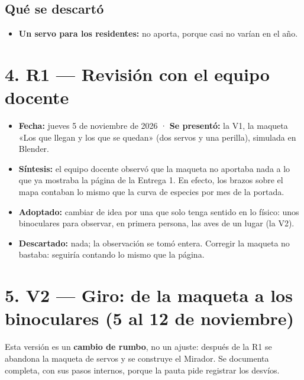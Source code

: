 \documentclass[11pt,a4paper]{article}
\newcommand{\seccion}[1]{\clearpage\section*{#1}}
\begin{document}
\subsection*{Qué se descartó}
\begin{itemize}
\item \textbf{Un servo para los residentes:} no aporta, porque casi no varían en el año.
\end{itemize}
\section*{4. R1 --- Revisión con el equipo docente}
\begin{itemize}
\item \textbf{Fecha:} jueves 5 de noviembre de 2026 · \textbf{Se presentó:} la V1, la maqueta «Los que llegan y los que se quedan» (dos servos y una perilla), simulada en Blender.
\item \textbf{Síntesis:} el equipo docente observó que la maqueta no aportaba nada a lo que ya mostraba la página de la Entrega 1. En efecto, los brazos sobre el mapa contaban lo mismo que la curva de especies por mes de la portada.
\item \textbf{Adoptado:} cambiar de idea por una que solo tenga sentido en lo físico: unos binoculares para observar, en primera persona, las aves de un lugar (la V2).
\item \textbf{Descartado:} nada; la observación se tomó entera. Corregir la maqueta no bastaba: seguiría contando lo mismo que la página.
\end{itemize}
\seccion{5. V2 --- Giro: de la maqueta a los binoculares (5 al 12 de noviembre)}
Esta versión es un \textbf{cambio de rumbo}, no un ajuste: después de la R1 se abandona la maqueta de servos y se construye el Mirador. Se documenta completa, con sus pasos internos, porque la pauta pide registrar los desvíos.
\end{document}
